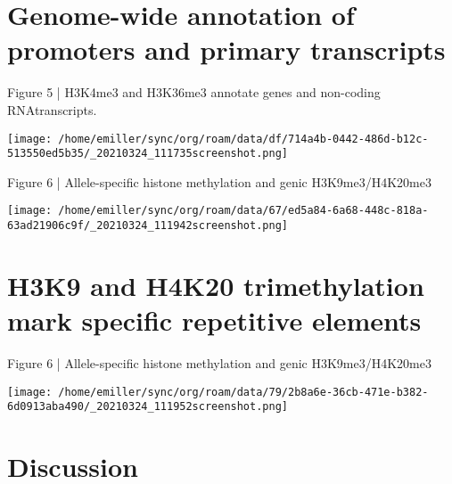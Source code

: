 \documentclass[bigger]{beamer}
\begin{document}
\section{Genome-wide annotation of promoters and primary transcripts}
\label{sec:org4634aa8}

\begin{frame}[label={sec:orga9d165b}]{Figure 5 | H3K4me3 and H3K36me3 annotate genes and non-coding RNAtranscripts.}
\begin{center}
\texttt{[image: /home/emiller/sync/org/roam/data/df/714a4b-0442-486d-b12c-513550ed5b35/\_20210324\_111735screenshot.png]}
\end{center}
\end{frame}


\begin{frame}[label={sec:org44a1ca7}]{Figure 6 | Allele-specific histone methylation and genic H3K9me3/H4K20me3}
\begin{center}
\texttt{[image: /home/emiller/sync/org/roam/data/67/ed5a84-6a68-448c-818a-63ad21906c9f/\_20210324\_111942screenshot.png]}
\end{center}
\end{frame}


\section{H3K9 and H4K20 trimethylation mark specific repetitive elements}
\label{sec:org732be3e}

\begin{frame}[label={sec:org47ded02}]{Figure 6 | Allele-specific histone methylation and genic H3K9me3/H4K20me3}
\begin{center}
\texttt{[image: /home/emiller/sync/org/roam/data/79/2b8a6e-36cb-471e-b382-6d0913aba490/\_20210324\_111952screenshot.png]}
\end{center}
\end{frame}

\section{Discussion}
\label{sec:org8bd7349}
\end{document}
